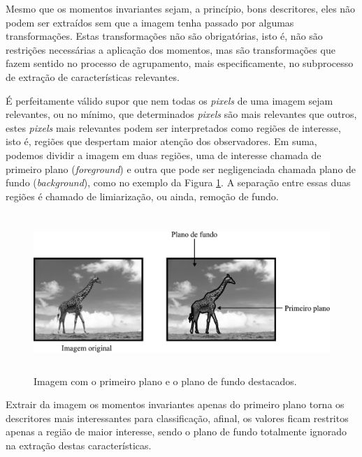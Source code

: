 Mesmo que os momentos invariantes sejam, a princípio, bons descritores, eles
não podem ser extraídos sem que a imagem tenha passado por algumas
transformações. Estas transformações não são obrigatórias, isto é, não são
restrições necessárias a aplicação dos momentos, mas são transformações que
fazem sentido no processo de agrupamento, mais especificamente, no subprocesso
de extração de características relevantes.

É perfeitamente válido supor que nem todas os \textit{pixels} de uma imagem sejam
relevantes, ou no mínimo, que determinados \textit{pixels} são mais relevantes
que outros, estes \textit{pixels} mais relevantes podem ser interpretados
como regiões de interesse, isto é, regiões que despertam maior atenção dos
observadores. Em suma, podemos dividir a imagem em duas regiões, uma de
interesse chamada de primeiro plano (\textit{foreground}) e outra que pode ser
negligenciada chamada plano de fundo (\textit{background}), como no exemplo
da Figura \ref{fig:girafa_limiarizacao}. A separação entre
essas duas regiões é chamado de limiarização, ou ainda, remoção de fundo.

\begin{figure}[H]
  \begin{center}
    \includegraphics[height=6cm]{imagens/girafa_limiarizacao.pdf}
  \end{center}
  \caption{ Imagem com o primeiro plano e o plano de fundo destacados. }
  \label{fig:girafa_limiarizacao}
\end{figure}

Extrair da imagem os momentos invariantes apenas do primeiro plano
torna os descritores mais interessantes para classificação, afinal, os valores
ficam restritos apenas a região de maior interesse, sendo o plano de fundo
totalmente ignorado na extração destas características.


